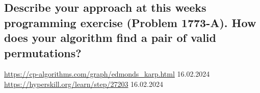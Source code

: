 \documentclass[runningheads]{llncs}
\begin{document}
\subsection*{Describe your approach at this weeks programming exercise (Problem 1773-A). How does your algorithm find a pair of valid permutations?}

\begin{thebibliography}{8}
     \url{https://cp-algorithms.com/graph/edmonds\_karp.html} 16.02.2024
     \url{https://hyperskill.org/learn/step/27203} 16.02.2024

\end{thebibliography}
\end{document}
